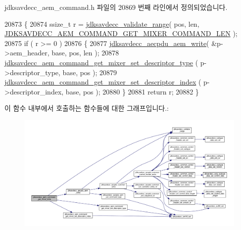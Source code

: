jdksavdecc\+\_\+aem\+\_\+command.\+h 파일의 20869 번째 라인에서 정의되었습니다.


\begin{DoxyCode}
20873 \{
20874     ssize\_t r = \hyperlink{group__util_ga9c02bdfe76c69163647c3196db7a73a1}{jdksavdecc\_validate\_range}( pos, len, 
      \hyperlink{group__command__get__mixer_gaa8242449700246096e957232cf625ed3}{JDKSAVDECC\_AEM\_COMMAND\_GET\_MIXER\_COMMAND\_LEN} );
20875     \textcolor{keywordflow}{if} ( r >= 0 )
20876     \{
20877         \hyperlink{group__aecpdu__aem_gad658e55771cce77cecf7aae91e1dcbc5}{jdksavdecc\_aecpdu\_aem\_write}( &p->aem\_header, base, pos, len );
20878         \hyperlink{group__command__get__mixer_ga0fdafa7972c85c0a695f9efde2dfbfb1}{jdksavdecc\_aem\_command\_get\_mixer\_set\_descriptor\_type}
      ( p->descriptor\_type, base, pos );
20879         \hyperlink{group__command__get__mixer_gaf94f7b62e48ccf2366c79231b331cdc3}{jdksavdecc\_aem\_command\_get\_mixer\_set\_descriptor\_index}
      ( p->descriptor\_index, base, pos );
20880     \}
20881     \textcolor{keywordflow}{return} r;
20882 \}
\end{DoxyCode}


이 함수 내부에서 호출하는 함수들에 대한 그래프입니다.\+:
\nopagebreak
\begin{figure}[H]
\begin{center}
\leavevmode
\includegraphics[width=350pt]{group__command__get__mixer_gad33e55c190c932fada5f05a16a8c39cd_cgraph}
\end{center}
\end{figure}


